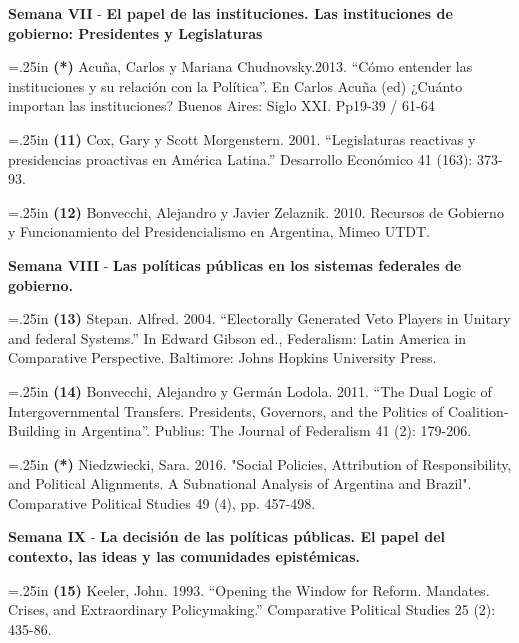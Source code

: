 \documentclass[11pt]{article}
\begin{document}
\clearpage
\vspace{.5cm}
\textbf{Semana VII} - \textbf{El papel de las instituciones. Las instituciones de gobierno: Presidentes y Legislaturas}

\begin{onehalfspacing}
\hangindent=.25in \noindent \textbf{(*)} Acuña, Carlos y Mariana Chudnovsky.2013. “Cómo entender las instituciones y su relación con la Política”. En Carlos Acuña (ed) ¿Cuánto importan las instituciones? Buenos Aires: Siglo XXI. Pp19-39 / 61-64

\hangindent=.25in \noindent \textbf{(11)} Cox, Gary y Scott Morgenstern. 2001. “Legislaturas reactivas y presidencias proactivas en América Latina.” Desarrollo Económico 41 (163): 373-93.

\hangindent=.25in \noindent \textbf{(12)} Bonvecchi, Alejandro y Javier Zelaznik. 2010. Recursos de Gobierno y Funcionamiento del Presidencialismo en Argentina, Mimeo UTDT.
\end{onehalfspacing}

\vspace{.5cm}

\textbf{Semana VIII} - \textbf{Las políticas públicas en los sistemas federales de gobierno.}
\begin{onehalfspacing}

\hangindent=.25in \noindent \textbf{(13)} Stepan. Alfred. 2004. “Electorally Generated Veto Players in Unitary and federal Systems.” In Edward Gibson ed., Federalism: Latin America in Comparative Perspective. Baltimore: Johns Hopkins University Press.


\hangindent=.25in \noindent \textbf{(14)}  Bonvecchi, Alejandro y Germán Lodola. 2011. “The Dual Logic of Intergovernmental Transfers. Presidents, Governors, and the Politics of Coalition-Building in Argentina”. Publius: The Journal of Federalism 41 (2): 179-206.

\hangindent=.25in \noindent \textbf{(*)}  Niedzwiecki, Sara. 2016. "Social Policies, Attribution of Responsibility, and Political Alignments. A Subnational Analysis of Argentina and Brazil". Comparative Political Studies 49 (4), pp. 457-498.
\end{onehalfspacing}

\vspace{.5cm}
\textbf{Semana IX } - \textbf{La decisión de las políticas públicas. El papel del contexto, las ideas y las comunidades epistémicas.}

 \hangindent=.25in \noindent\textbf{(15)} Keeler, John. 1993. “Opening the Window for Reform. Mandates. Crises, and Extraordinary Policymaking.” Comparative Political Studies 25 (2): 435-86.
\end{document}
